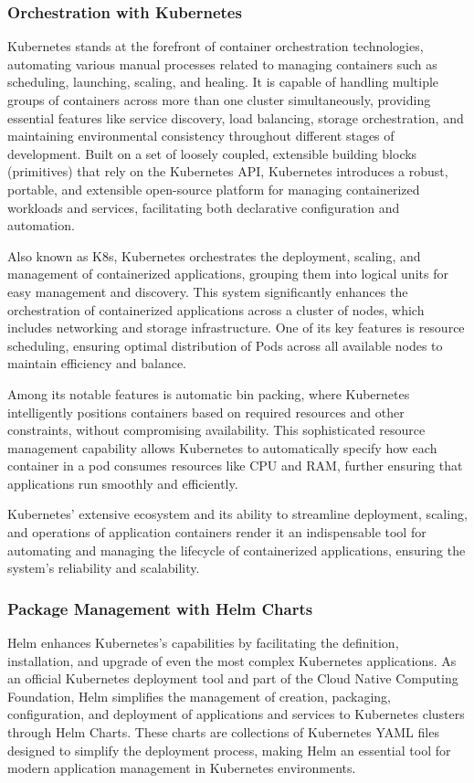 \documentclass{article}
\begin{document}
    \subsubsection{Orchestration with Kubernetes}
    Kubernetes stands at the forefront of container orchestration technologies, automating various manual processes related to managing containers such as scheduling, launching, scaling, and healing. It is capable of handling multiple groups of containers across more than one cluster simultaneously, providing essential features like service discovery, load balancing, storage orchestration, and maintaining environmental consistency throughout different stages of development. Built on a set of loosely coupled, extensible building blocks (primitives) that rely on the Kubernetes API, Kubernetes introduces a robust, portable, and extensible open-source platform for managing containerized workloads and services, facilitating both declarative configuration and automation.

    Also known as K8s, Kubernetes orchestrates the deployment, scaling, and management of containerized applications, grouping them into logical units for easy management and discovery. This system significantly enhances the orchestration of containerized applications across a cluster of nodes, which includes networking and storage infrastructure. One of its key features is resource scheduling, ensuring optimal distribution of Pods across all available nodes to maintain efficiency and balance.

    Among its notable features is automatic bin packing, where Kubernetes intelligently positions containers based on required resources and other constraints, without compromising availability. This sophisticated resource management capability allows Kubernetes to automatically specify how each container in a pod consumes resources like CPU and RAM, further ensuring that applications run smoothly and efficiently.

    Kubernetes' extensive ecosystem and its ability to streamline deployment, scaling, and operations of application containers render it an indispensable tool for automating and managing the lifecycle of containerized applications, ensuring the system's reliability and scalability.

    \subsubsection{Package Management with Helm Charts}
    Helm enhances Kubernetes's capabilities by facilitating the definition, installation, and upgrade of even the most complex Kubernetes applications. As an official Kubernetes deployment tool and part of the Cloud Native Computing Foundation, Helm simplifies the management of creation, packaging, configuration, and deployment of applications and services to Kubernetes clusters through Helm Charts. These charts are collections of Kubernetes YAML files designed to simplify the deployment process, making Helm an essential tool for modern application management in Kubernetes environments.
\end{document}
